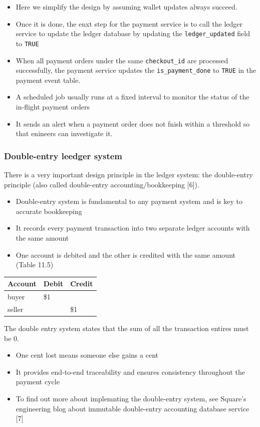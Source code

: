 \documentclass{report}
\theoremstyle{definition}
\let\oldsubsubsection\subsubsection
\renewcommand{\subsubsection}{\oldsubsubsection*}
\begin{document}
\begin{itemize}
\item
Here we simplify the design by assuming wallet updates always succeed.
\item
Once it is done, the enxt step for the payment service is to call the ledger service to update the ledger database by updating the \lstinline|ledger_updated| field to \lstinline|TRUE|
\item
When all payment orders under the same \lstinline|checkout_id| are processed successfully, the payment service updates the \lstinline|is_payment_done| to \lstinline|TRUE| in the payment event table.
\item
A scheduled job usually runs at a fixed interval to monitor the status of the in-flight payment orders
\item
It sends an alert when a payment order does not fnish within a threshold so that enineers can investigate it.
\end{itemize}

\subsubsection{Double-entry leedger system}

There is a very important design principle in the ledger system: the double-entry principle (also called double-entry accounting/bookkeeping [6]).

\begin{itemize}
\item
Double-entry system is fundamental to any payment system and is key to accurate bookkeeping
\item
It records every payment transaction into two separate ledger accounts with the same amount
\item
One account is debited and the other is credited with the same amount (Table 11.5)
\end{itemize}

\begin{tabular}{|p{4cm}|p{4cm}|p{4cm}|}
\hline
Account & Debit & Credit  \\
\hline
buyer & \$1 &   \\
\hline
seller & & \$1  \\
\hline
\end{tabular}

The double entry system states that the sum of all the transaction entires must be 0.

\begin{itemize}
\item
One cent lost means someone else gains a cent
\item
It provides end-to-end traceability and ensures consistency throughout the payment cycle
\item
To find out more about implemnting the double-entry system, see Square's engineering blog about immutable double-entry accounting database service [7]
\end{itemize}
\end{document}
